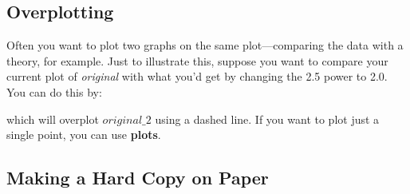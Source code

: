 \documentclass[psfig,preprint]{aastex}
\begin{document}
\subsection {Overplotting}

	Often you want to plot two graphs on the same plot---comparing
the data with a theory, for example. Just to illustrate this, suppose
you want to compare your current plot of {\it original} with what you'd
get by changing the 2.5 power to 2.0. You can do this by:



\noindent which will overplot $original\_2$ using a dashed line. If you
want to plot just a single point, you can use {\bf plots}.

\subsection {Making a Hard Copy on Paper}
\end{document}
